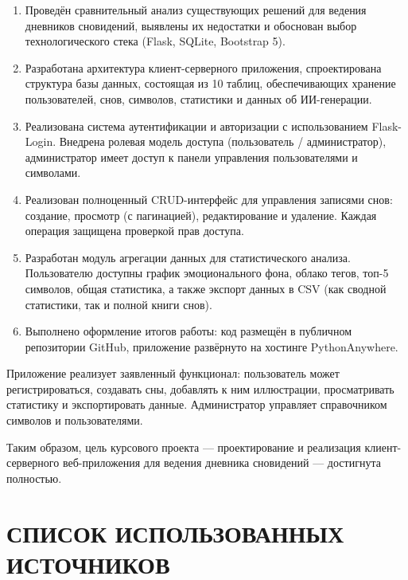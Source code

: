 \documentclass[14pt, a4paper]{extarticle}
\begin{document}
\begin{enumerate}
    \item Проведён сравнительный анализ существующих решений для ведения дневников сновидений, выявлены их недостатки и обоснован выбор технологического стека (Flask, SQLite, Bootstrap 5).
    
    \item Разработана архитектура клиент-серверного приложения, спроектирована структура базы данных, состоящая из 10 таблиц, обеспечивающих хранение пользователей, снов, символов, статистики и данных об ИИ-генерации.
    
    \item Реализована система аутентификации и авторизации с использованием Flask-Login. Внедрена ролевая модель доступа (пользователь / администратор), администратор имеет доступ к панели управления пользователями и символами.
    
    \item Реализован полноценный CRUD-интерфейс для управления записями снов: создание, просмотр (с пагинацией), редактирование и удаление. Каждая операция защищена проверкой прав доступа.
    
    \item Разработан модуль агрегации данных для статистического анализа. Пользователю доступны график эмоционального фона, облако тегов, топ-5 символов, общая статистика, а также экспорт данных в CSV (как сводной статистики, так и полной книги снов).
    
    \item Выполнено оформление итогов работы: код размещён в публичном репозитории GitHub, приложение развёрнуто на хостинге PythonAnywhere.
\end{enumerate}

Приложение реализует заявленный функционал: пользователь может регистрироваться, создавать сны, добавлять к ним иллюстрации, просматривать статистику и экспортировать данные. Администратор управляет справочником символов и пользователями.

Таким образом, цель курсового проекта — проектирование и реализация клиент-серверного веб-приложения для ведения дневника сновидений — достигнута полностью.

\newpage


\section*{СПИСОК ИСПОЛЬЗОВАННЫХ ИСТОЧНИКОВ}
\end{document}
